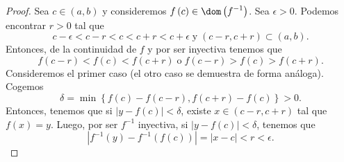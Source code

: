 \begin{proof}
Sea $\displaystyle c \in \left(a,b\right) $ y consideremos $\displaystyle f\left(c\right) \in \dom\left(f^{-1}\right) $. Sea $\displaystyle \epsilon > 0 $. Podemos encontrar $\displaystyle r > 0 $ tal que 
\[ c - \epsilon < c - r < c < c+ r < c + \epsilon \; \text{y} \; \left(c - r, c + r\right) \subset \left(a,b\right) .\]
Entonces, de la continuidad de $\displaystyle f $ y por ser inyectiva tenemos que 
\[f\left(c - r\right) < f\left(c\right) < f\left(c + r\right) \; \text{o} \; f\left(c - r\right) > f\left(c\right) > f\left(c + r\right) .\]
Consideremos el primer caso (el otro caso se demuestra de forma análoga). Cogemos 
\[\displaystyle \delta = \min \left\{ f\left(c\right) - f\left(c - r\right), f\left(c + r\right) - f\left(c\right)\right\} >0. \] Entonces, tenemos que si $\displaystyle \left|y - f\left(c\right)\right| < \delta  $, existe $\displaystyle x \in \left(c - r, c + r\right) $ tal que $\displaystyle f\left(x\right) = y $. Luego, por ser $\displaystyle f^{-1} $ inyectiva, si $\displaystyle \left|y - f\left(c\right)\right| < \delta  $, tenemos que
\[ \left|f^{-1}\left(y\right) - f^{-1}\left(f\left(c\right)\right)\right| = \left|x - c\right| < r < \epsilon  .\]
\end{proof}
